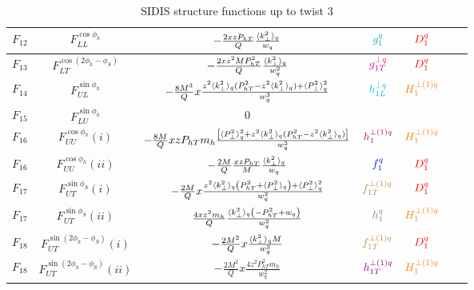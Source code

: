 \documentclass[floatfix,aps,prd,nofootinbib,superscriptaddress,preprint]{revtex4}
\newcommand\3[1]{\boldsymbol{#1}}
\newcommand{\Phperp}{P_{hT}}
\begin{document}
\begin{table}[h!]
\begin{tabular}{|c|c|c|c|c|c|c|}
$F_{12}$ & $F_{LL}^{\cos\phi_h}$               & $-\frac{2xz\Phperp}{Q}\frac{\avk}{w_q}$                                                     & $\ppdf$         & ${\color{red} D_1^{q}}$           \\\hline
$F_{13}$ & $F_{LT}^{\cos(2\phi_h -\phi_S)}$    & $-\frac{2 x z^2 M \Phperp^2}{Q}\frac{\avk}{w_q^2}$                                          & ${\color{magenta} g^{\perp q}_{1T}}$          & ${\color{red} D_1^{q}}$           \\\hline
$F_{14}$ & $F_{UL}^{\sin\phi_h}$               & $-\frac{8M^3}{Q} x \frac{z^2\avk (\Phperp^2-z^2\avk)+\avp^2}{w_q^3}$                        & ${\color{cyan}h^{\perp q}_{1L}}$          & ${\color{orange} H^{\perp(1)q}_{1} }$      \\\hline
$F_{15}$ & $F_{LU}^{\sin\phi_h}$               & $0$                                                                                         &                 & \\\hline
$F_{16}$ & $F_{UU}^{\cos\phi_h}(i)$            & $-\frac{8M}{Q} xz\Phperp m_h \frac{\left[\avp^2+z^2 \avk (\Phperp^2  -z^2\avk ) \right]}{w_q^3}$ & ${\color{purple} h^{\perp(1)q}_1 }$  & ${\color{orange} H^{\perp(1)q}_{1} }$      \\\hline
$F_{16}$ & $F_{UU}^{\cos\phi_h}(ii)$           & $-\frac{2M}{Q} \frac{xz\Phperp}{M} \frac{\avk}{w_q}$                                                           & ${\color{blue} f_1^q}$          & ${\color{red} D_1^{q}} $          \\\hline
$F_{17}$ & $F_{UT}^{\sin\phi_S}(i)$            & $-\frac{2M}{Q} x \frac{z^2\avk \left(\Phperp^2+\avp\right) + \avp^2}{w_q^2}$                & ${\color{brown} f^{\perp(1)q}_{1T}}$       & ${\color{red} D_1^{q}}$           \\\hline
$F_{17}$ & $F_{UT}^{\sin\phi_S}(ii)$           & $\frac{4 x z^2 m_h}{Q}\frac{\avk\left(-\Phperp^2+w_q\right)}{w_q^2} $                       & $\transversity$ & ${\color{orange} H^{\perp(1)q}_{1} }$      \\\hline
$F_{18}$ & $F_{UT}^{\sin(2\phi_h-\phi_S)}(i)$  & $-\frac{2M^2}{Q} x \frac{\langle k_{\perp}^2\rangle_q M}{w_q^2} $                                                   & ${\color{brown} f^{\perp(1)q}_{1T}}$       & ${\color{red} D_1^{q}}$           \\\hline
$F_{18}$ & $F_{UT}^{\sin(2\phi_h-\phi_S)}(ii)$ & $-\frac{2M^2}{Q} x \frac{4z^2 \Phperp^2 m_h}{w_q^2}$                                        & ${\color{violet} h^{\perp(1)q}_{1T} }$ & ${\color{orange} H^{\perp(1)q}_{1} }$      \\\hline
\end{tabular}
\caption{SIDIS structure functions up to twist 3}
\label{t.chi2}
\end{table}
\end{document}
